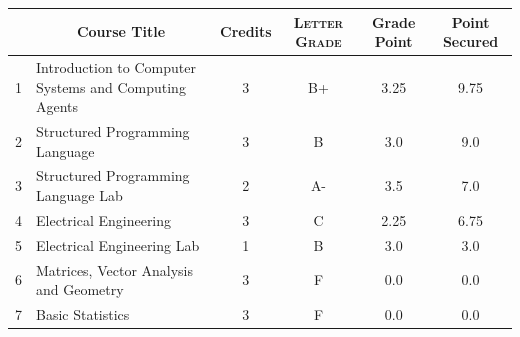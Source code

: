 \documentclass[11pt]{article}
\newcommand*{\numtwo}[1]{\pgfmathprintnumber[
                    fixed, precision=2, fixed zerofill=true]{#1}}
\begin{document}
                \begin{center}
                    \renewcommand{\arraystretch}{1.08}
                    
                \begin{tabular}{|c|l|c|>{\scshape}c|c|c|}
                \hline  \rule[-1ex]{0pt}{3.5ex} {\centering{\bf Course Code}} &  \multicolumn{1}{c|}{\textbf{Course Title}}  & {\bf Credits} & {\bf Letter Grade} & {\bf Grade Point} & {\bf Point Secured}  \\ 
                \hline   1 &  Introduction to Computer Systems and Computing Agents		 & 3 & B+ & 3.25 & 9.75 \\ %
                \hline   2 &  Structured Programming Language		 & 3 & B & 3.0 & 9.0 \\ %
                \hline   3 &  Structured Programming Language Lab		 & 2 & A- & 3.5 & 7.0 \\ %
                \hline   4 &  Electrical Engineering		 & 3 & C & 2.25 & 6.75 \\ %
                \hline   5 &  Electrical Engineering Lab		 & 1 & B & 3.0 & 3.0 \\ %
                \hline   6 &  Matrices, Vector Analysis and Geometry		 & 3 & F & 0.0 & 0.0 \\ %
                \hline   7 &  Basic Statistics		 & 3 & F & 0.0 & 0.0 \\ %

\hline                %
                \end{tabular}
                \end{center}
                \renewcommand{\arraystretch}{1.03}
\end{document}
